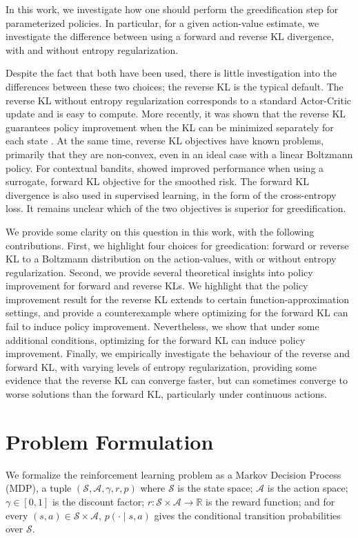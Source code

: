 \documentclass[twoside,11pt]{article}
\newcommand{\R}{\mathbb{R}}
\newcommand{\statespace}{\mathcal{S}}
\newcommand{\actionspace}{\mathcal{A}}
\begin{document}
In this work, we investigate how one should perform the greedification step for parameterized policies. In particular, for a given action-value estimate, we investigate the difference between using a forward and reverse KL divergence, with and without entropy regularization. 

Despite the fact that both have been used, there is little investigation into the differences between these two choices; the reverse KL is the typical default. The reverse KL without entropy regularization corresponds to a standard Actor-Critic update and is easy to compute. More recently, it was shown that the reverse KL guarantees policy improvement when the KL can be minimized separately for each state \citep[p.~4]{haarnoja2018soft}. At the same time, reverse KL objectives have known problems, primarily that they are non-convex, even in an ideal case with a linear Boltzmann policy. For contextual bandits, \citet{chen2019surrogate} showed improved performance when using a surrogate, forward KL objective for the smoothed risk. The forward KL divergence is also used in supervised learning, in the form of the cross-entropy loss. It remains unclear which of the two objectives is superior for greedification.


We provide some clarity on this question in this work, with the following contributions. First, we highlight four choices for greedication: forward or reverse KL to a Boltzmann distribution on the action-values, with or without entropy regularization. 
Second, we provide several theoretical insights into policy improvement for forward and reverse KLs. We highlight that the policy improvement result for the reverse KL extends to certain function-approximation settings, and provide a counterexample where optimizing for the forward KL can fail to induce policy improvement. Nevertheless, we show that under some additional conditions, optimizing for the forward KL can induce policy improvement.  Finally, we empirically investigate the behaviour of the reverse and forward KL, with varying levels of entropy regularization, providing some evidence that the reverse KL can converge faster, but can sometimes converge to worse solutions than the forward KL, particularly under continuous actions. 


\section{Problem Formulation}

We formalize the reinforcement learning \citep{sutton2018reinforcement} problem as a {Markov Decision Process} (MDP), a tuple $(\statespace, \actionspace, \gamma, r, p)$ where $\statespace$ is the state space; $\actionspace$ is the action space; $\gamma \in [0,1]$ is the discount factor; $r : \statespace \times \actionspace \to \R$ is the reward function; and for every $(s, a) \in \statespace \times \actionspace$, $p(\cdot \mid s, a)$ gives the conditional transition probabilities over $\statespace$. 
\end{document}
